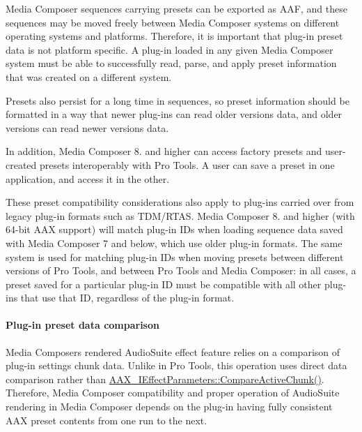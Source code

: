 Media Composer sequences carrying presets can be exported as A\+AF, and these sequences may be moved freely between Media Composer systems on different operating systems and platforms. Therefore, it is important that plug-\/in preset data is not platform specific. A plug-\/in loaded in any given Media Composer system must be able to successfully read, parse, and apply preset information that was created on a different system.

Presets also persist for a long time in sequences, so preset information should be formatted in a way that newer plug-\/ins can read older version\textquotesingle{}s data, and older versions can read newer version\textquotesingle{}s data.

In addition, Media Composer 8. and higher can access factory presets and user-\/created presets interoperably with Pro Tools. A user can save a preset in one application, and access it in the other.

These preset compatibility considerations also apply to plug-\/ins carried over from legacy plug-\/in formats such as T\+D\+M/\+R\+T\+AS. Media Composer 8. and higher (with 64-\/bit A\+AX support) will match plug-\/in I\+Ds when loading sequence data saved with Media Composer 7 and below, which use older plug-\/in formats. The same system is used for matching plug-\/in I\+Ds when moving presets between different versions of Pro Tools, and between Pro Tools and Media Composer\+: in all cases, a preset saved for a particular plug-\/in ID must be compatible with all other plug-\/ins that use that ID, regardless of the plug-\/in format.

\hypertarget{a00831_subsubsection__aax_media_composer_guide__features__presets__comparison}{}\paragraph{Plug-\/in preset data comparison}\label{a00831_subsubsection__aax_media_composer_guide__features__presets__comparison}
 Media Composer\textquotesingle{}s rendered Audio\+Suite effect feature relies on a comparison of plug-\/in settings chunk data. Unlike in Pro Tools, this operation uses direct data comparison rather than \mbox{\hyperlink{a01669_a1e86f849e970c9998313fc7d451ccf85}{A\+A\+X\+\_\+\+I\+Effect\+Parameters\+::\+Compare\+Active\+Chunk()}}. Therefore, Media Composer compatibility and proper operation of Audio\+Suite rendering in Media Composer depends on the plug-\/in having fully consistent A\+AX preset contents from one run to the next.


